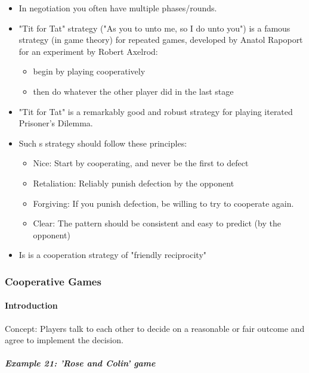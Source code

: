 \begin{itemize}
    \item In negotiation you often have multiple phases/rounds.
    \item "Tit for Tat" strategy ("As you to unto me, so I do unto you") is
        a famous strategy (in game theory) for repeated games, developed by
        Anatol Rapoport for an experiment by Robert Axelrod:
        \begin{itemize}
            \item begin by playing cooperatively
            \item then do whatever the other player did in the last stage
        \end{itemize}
    \item "Tit for Tat" is a remarkably good and robust strategy for playing
        iterated Prisoner's Dilemma.
    \item Such s strategy should follow these principles:
        \begin{itemize}
            \item Nice: Start by cooperating, and never be the first to defect
            \item Retaliation: Reliably punish defection by the opponent
            \item Forgiving: If you punish defection, be willing to try to
                cooperate again.
            \item Clear: The pattern should be consistent and easy to predict
                (by the opponent)
        \end{itemize}
    \item Is is a cooperation strategy of "friendly reciprocity"
\end{itemize}

\subsubsection{Cooperative Games}

\paragraph{Introduction}

Concept: Players talk to each other to decide on a reasonable or fair outcome
and agree to implement the decision.

\subparagraph{Example 21: 'Rose and Colin' game}

